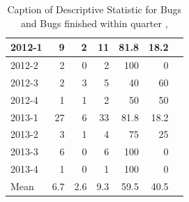\documentclass[UKenglish]{ifimaster}  %
\begin{document}
\begin{table}[!htbp]
\begin{adjustwidth}{-2.5cm}{}
{{\begin{tabular}{ | l | r | r | r | r | r | r | }
2012-1 & 9 & 2 & 11 & 81.8 & 18.2 \\ \hline
2012-2 & 2 & 0 & 2 & 100 & 0 \\ \hline
2012-3 & 2 & 3 & 5 & 40 & 60 \\ \hline
2012-4 & 1 & 1 & 2 & 50 & 50 \\ \hline
2013-1 & 27 & 6 & 33 & 81.8 & 18.2 \\ \hline
2013-2 & 3 & 1 & 4 & 75 & 25 \\ \hline
2013-3 & 6 & 0 & 6 & 100 & 0 \\ \hline
2013-4 & 1 & 0 & 1 & 100 & 0 \\ \hline
Mean &6.7&2.6&9.3&59.5&40.5 \\ \hline

\end{tabular}
}
}
\end{adjustwidth}
\caption[Optional caption for list of figures]{Caption of Descriptive Statistic for Bugs and Bugs finished within quarter  , }
\label{DS:8:5} %
\end{table}
\end{document}

